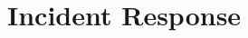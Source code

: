 \documentclass[../main.tex]{subfiles}
\begin{document}
\chapter{Incident Response}
\label{ch:incident-response}

\end{document}
